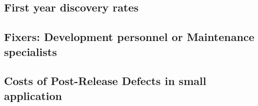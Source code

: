 %
%


\subsection{First year discovery rates}

\subsection{Fixers: Development personnel or Maintenance specialists}

\subsection{Costs of Post-Release Defects in small application}


